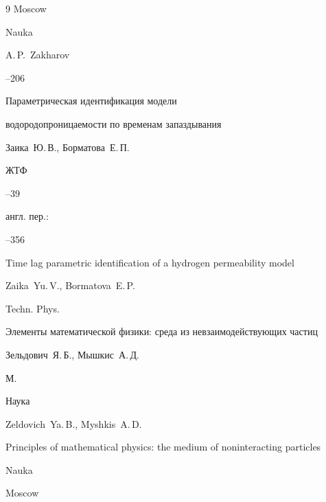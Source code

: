 \begin{thebibliography}{9}
\publaddr Moscow

\publ Nauka

\ed A.\,P.~Zakharov


--206










\paper Параметрическая идентификация модели

водородопроницаемости по временам запаздывания

\by Заика~Ю.\,В., Борматова~Е.\,П.

\jour ЖТФ




--39

\transl \mbox{англ.} пер.:~




--356

\paper Time lag parametric identification of a hydrogen permeability model

\by Zaika~Yu.\,V., Bormatova~E.\,P.

\jour Techn. Phys.








\book Элементы математической физики: среда из невзаимодействующих частиц

\by Зельдович~Я.\,Б., Мышкис~А.\,Д.

\publaddr М.

\publ Наука



\misctransl

\by Zeldovich~Ya.\,B., Myshkis~A.\,D. 

\book Principles of mathematical physics: the medium of noninteracting particles

\publ Nauka

\publaddr Moscow












\end{thebibliography}
